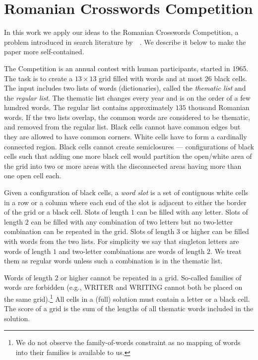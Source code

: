 \section{Romanian Crosswords Competition}
\label{sec::roco}

In this work we apply our ideas to the Romanian Crosswords Competition, a problem introduced in search literature by~\citeauthor{DBLP:conf/socs/BoteaB21}~.
We describe it below to make the paper more self-contained.

The Competition is an annual contest with human participants, started in 1965.
The task is to create a $13\times13$ grid filled with words and
at most $26$ black cells.
The input includes two lists of words (dictionaries), called the \emph{thematic list}
and the \emph{regular list}.
The thematic list changes every year and is on the order of a few hundred words.
The regular list contains approximately $135$ thousand Romanian words.
If the two lists overlap, the common words 
are considered to be thematic, and removed from the regular list.
Black cells cannot have common edges but they are allowed to have common corners. 
White cells have to form a cardinally connected region. Black cells cannot create semiclosures --- configurations of black cells such that
adding one more black cell would partition the open/white area of the grid into two or more
areas with the disconnected areas having more than one open cell each.

Given a configuration of black cells, a \emph{word slot}
is a set of contiguous white cells in a  row or a column
where each end of the slot is adjacent to either the 
border of the grid or a black cell.
%
Slots of length $1$ can be filled with any letter.
Slots of length $2$ can be filled with any combination of two letters
but no two-letter combination can be repeated in the grid.
Slots of length $3$ or higher can be filled with words from the two lists.
For simplicity we say that singleton letters are words
of length $1$ and two-letter combinations are words of length $2$.
We treat them as regular words unless such a combination is in the thematic list.%

Words of length $2$ or higher cannot be repeated in a grid.
So-called families of words are forbidden (e.g., 
WRITER and WRITING cannot both be placed on the same grid).\footnote{We do not observe the family-of-words constraint as no mapping of words into their families is available to us.}
All cells in a (full) solution must contain a letter or a black cell.
The score of a grid is the sum of the lengths of all thematic words included in the solution. 

